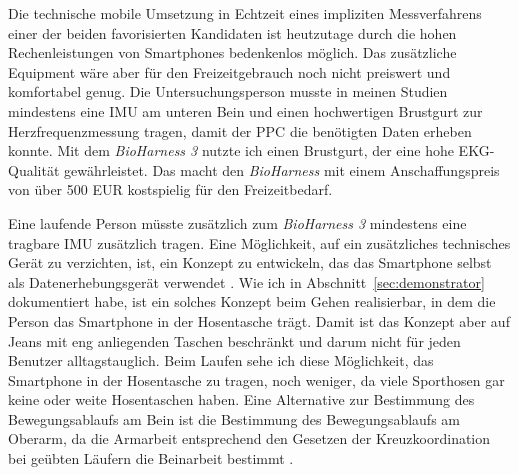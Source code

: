 Die technische mobile Umsetzung in Echtzeit eines impliziten Messverfahrens einer der beiden favorisierten Kandidaten ist heutzutage durch die hohen Rechenleistungen von Smartphones bedenkenlos möglich. Das zusätzliche Equipment wäre aber für den Freizeitgebrauch noch nicht preiswert und komfortabel genug. Die Untersuchungsperson musste in meinen Studien mindestens eine \ac{IMU} am unteren Bein und einen hochwertigen Brustgurt zur Herzfrequenzmessung tragen, damit der \ac{PPC} die benötigten Daten erheben konnte. Mit dem \emph{BioHarness 3} nutzte ich einen Brustgurt, der eine hohe \ac{EKG}-Qualität gewährleistet. Das macht den \emph{BioHarness} mit einem Anschaffungspreis von über 500 EUR kostspielig für den Freizeitbedarf. 

Eine laufende Person müsste zusätzlich zum \emph{BioHarness 3} mindestens eine tragbare \ac{IMU} zusätzlich tragen. Eine Möglichkeit, auf ein zusätzliches technisches Gerät zu verzichten, ist, ein Konzept zu entwickeln, das das Smartphone selbst als Datenerhebungsgerät verwendet \citep[vgl.][]{Strohrmann2013, Strohrmann2014}. Wie ich in Abschnitt~\ref{sec:demonstrator} dokumentiert habe, ist ein solches Konzept beim Gehen realisierbar, in dem die Person das Smartphone in der Hosentasche trägt. Damit ist das Konzept aber auf Jeans mit eng anliegenden Taschen beschränkt und darum nicht für jeden Benutzer alltagstauglich. Beim Laufen sehe ich diese Möglichkeit, das Smartphone in der Hosentasche zu tragen, noch weniger, da viele Sporthosen gar keine oder weite Hosentaschen haben. Eine Alternative zur Bestimmung des Bewegungsablaufs am Bein ist die Bestimmung des Bewegungsablaufs am Oberarm, da die Armarbeit entsprechend den Gesetzen der Kreuzkoordination bei geübten Läufern die Beinarbeit bestimmt \citep[vgl.][S.~70]{Marquardt2011}.